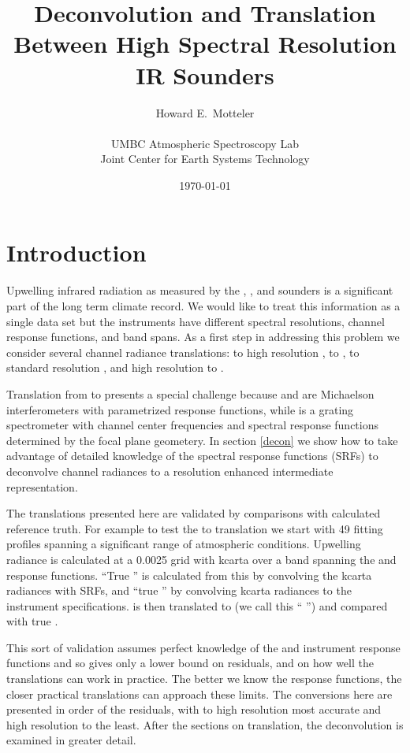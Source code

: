 \documentclass[12pt]{article}
\title{Deconvolution and Translation \\
  Between High Spectral Resolution  \\
  IR Sounders \\
}
\author{Howard E.~Motteler \\
  \\
  UMBC Atmospheric Spectroscopy Lab \\
  Joint Center for Earth Systems Technology \\
}
\date{\today}
\begin{document}
\maketitle

\section{Introduction}

Upwelling infrared radiation as measured by the {\airs}, {\iasi},
and {\cris} sounders is a significant part of the long term climate
record.  We would like to treat this information as a single data
set but the instruments have different spectral resolutions, channel
response functions, and band spans.  As a first step in addressing
this problem we consider several channel radiance translations:
{\iasi} to high resolution {\cris}, {\iasi} to {\airs}, {\airs} to
standard resolution {\cris}, and high resolution {\cris} to {\airs}.

Translation from {\airs} to {\cris} presents a special challenge
because {\cris} and {\iasi} are Michaelson interferometers with
parametrized response functions, while {\airs} is a grating
spectrometer with channel center frequencies and spectral response
functions determined by the focal plane geometery.  In section
\ref{decon} we show how to take advantage of detailed knowledge of
the {\airs} spectral response functions (SRFs) to deconvolve {\airs}
channel radiances to a resolution enhanced intermediate
representation.

The translations presented here are validated by comparisons with
calculated reference truth.  For example to test the {\iasi} to
{\airs} translation we start with 49 fitting profiles spanning a
significant range of atmospheric conditions.  Upwelling radiance is
calculated at a 0.0025 {\wn} grid with kcarta over a band spanning
the {\airs} and {\iasi} response functions.  ``True {\airs}'' is
calculated from this by convolving the kcarta radiances with {\airs}
SRFs, and ``true {\iasi}'' by convolving kcarta radiances to the
{\iasi} instrument specifications.  {\iasi} is then translated to
{\airs} (we call this ``{\iasi} {\airs}'') and compared with true
{\airs}.

This sort of validation assumes perfect knowledge of the {\airs} 
and {\iasi} instrument response functions and so gives only a lower
bound on residuals, and on how well the translations can work in
practice.  The better we know the response functions, the closer
practical translations can approach these limits.  The conversions
here are presented in order of the residuals, with {\iasi} to high
resolution {\cris} most accurate and high resolution {\cris} to
{\airs} the least.  After the sections on translation, the {\airs}
deconvolution is examined in greater detail.
\end{document}
